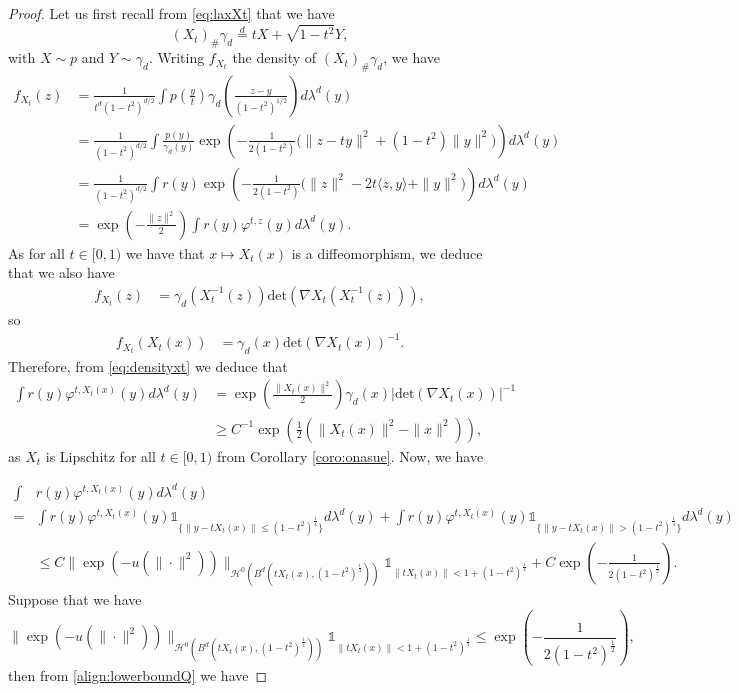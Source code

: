\documentclass{article}
\begin{document}
\begin{proof}
Let us first recall from \eqref{eq:laxXt} that we have 
\begin{equation}\label{eq:lawbis}
(X_t)_{\#}\gamma_d\overset{d}{=}tX+\sqrt{1-t^2}Y,
\end{equation}
with $X\sim p$ and $Y\sim \gamma_d$. Writing $f_{X_t}$ the density of $(X_t)_{\#}\gamma_d$, we have
\begin{align}\label{eq:densityxt}
f_{X_t}(z)&=\frac{1}{t^d(1-t^2)^{d/2}}\int p(\frac{y}{t})\gamma_d(\frac{z-y}{(1-t^2)^{1/2}})d\lambda^d(y)\nonumber \\
&=\frac{1}{(1-t^2)^{d/2}}\int \frac{p(y)}{\gamma_d(y)}\exp\left(-\frac{1}{2(1-t^2)}\big(\|z-ty\|^2+(1-t^2)\|y\|^2\big)\right)d\lambda^d(y)\nonumber \\
&=\frac{1}{(1-t^2)^{d/2}}\int r(y)\exp\left(-\frac{1}{2(1-t^2)}\big(\|z\|^2-2t\langle z,y\rangle+\|y\|^2\big)\right)d\lambda^d(y)\nonumber \\
& = \exp(-\frac{\|z\|^2}{2}) \int r(y)\varphi^{t,z}(y)d\lambda^d(y).
\end{align}
As for all $t\in [0,1)$ we have that $x\mapsto X_t(x)$ is a diffeomorphism, we deduce that we also have 
\begin{align*}
f_{X_t}(z)&=\gamma_d(X_t^{-1}(z))\text{det}(\nabla X_t(X_t^{-1}(z))),
\end{align*}
so 
\begin{align*}
f_{X_t}(X_t(x))&=\gamma_d(x)\text{det}(\nabla X_t(x))^{-1}.
\end{align*}
Therefore, from \eqref{eq:densityxt} we deduce that
\begin{align}\label{align:lowerboundQ}
\int r(y)\varphi^{t,X_t(x)}(y)d\lambda^d(y)&= \exp(\frac{\|X_t(x)\|^2}{2})\gamma_d(x)|\text{det}(\nabla X_t(x))|^{-1}\nonumber\\
& \geq C^{-1}\exp(\frac{1}{2}(\|X_t(x)\|^2-\|x\|^2)),
\end{align}
as $X_t$ is Lipschitz for all $t\in [0,1)$ from Corollary \ref{coro:onasue}. Now, we have

\begin{align}\label{align:upperboundQ}
    \int& r(y)\varphi^{t,X_t(x)}(y)d\lambda^d(y)\nonumber\\
    = &\int r(y)\varphi^{t,X_t(x)}(y)\mathds{1}_{\{\|y-tX_t(x)\|\leq (1-t^2)^{\frac{1}{4}}\}}d\lambda^d(y)+\int r(y)\varphi^{t,X_t(x)}(y)\mathds{1}_{\{\|y-tX_t(x)\|> (1-t^2)^{\frac{1}{4}}\}}d\lambda^d(y)\nonumber \\
    & \leq C \|\exp\left(-u(\|\cdot\|^2)\right)\|_{\mathcal{H}^0(B^d(tX_t(x),(1-t^2)^{\frac{1}{4}}))}\mathds{1}_{\|tX_t(x)\|<1 + (1-t^2)^{\frac{1}{4}}}+C\exp\left(-\frac{1}{2(1-t^2)^{\frac{1}{2}}}\right).
\end{align}
Suppose that we have $$\|\exp\left(-u(\|\cdot\|^2)\right)\|_{\mathcal{H}^0(B^d(tX_t(x),(1-t^2)^{\frac{1}{4}}))}\mathds{1}_{\|tX_t(x)\|<1 + (1-t^2)^{\frac{1}{4}}}\leq\exp\left(-\frac{1}{2(1-t^2)^{\frac{1}{2}}}\right),$$
then from \eqref{align:lowerboundQ} we have


\end{proof}
\end{document}
